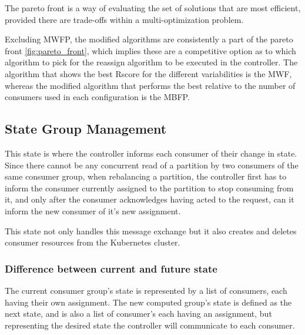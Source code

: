 The pareto front is a way of evaluating the set of solutions that are most efficient, provided there are trade-offs within a multi-optimization problem.

Excluding MWFP, the modified algorithms are consistently a part of the pareto front \ref{fig:pareto_front}, which implies these are a competitive option as to which algorithm to pick for the reassign algorithm to be executed in the controller. The algorithm that shows the best Rscore for the different variabilities is the MWF, whereas the modified algorithm that performs the best relative to the number of consumers used in each configuration is the MBFP.

\subsection{State Group Management}

This state is where the controller informs each consumer of their change in state. Since there cannot be any concurrent read of a partition by two consumers of the same consumer group, when rebalancing a partition, the controller first has to inform the consumer currently assigned to the partition to stop consuming from it, and only after the consumer acknowledges having acted to the request, can it inform the new consumer of it's new assignment.

This state not only handles this message exchange but it also creates and deletes consumer resources from the Kubernetes cluster. 

\subsubsection{Difference between current and future state}

The current consumer group's state is represented by a list of consumers, each having their own assignment. The new computed group's state is defined as the next state, and is also a list of consumer's each having an assignment, but representing the desired state the controller will communicate to each consumer.


